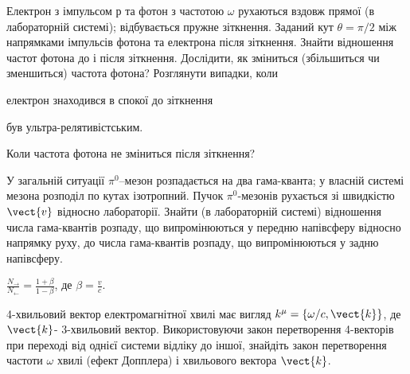\begin{problem}
Електрон з імпульсом $р$ та фотон з частотою $\omega$ рухаються вздовж прямої (в лабораторній системі); відбувається пружне зіткнення. Заданий кут $\theta = \pi/2$ між напрямками імпульсів фотона та електрона після зіткнення. Знайти відношення частот фотона до і після зіткнення. Дослідити, як зміниться (збільшиться чи зменшиться) частота фотона? Розглянути випадки, коли
\begin{enumerate*}[label=\alph*)]
	\item електрон знаходився в спокої до зіткнення
	\item був ультра-релятивістським.
\end{enumerate*}
Коли частота фотона не зміниться після зіткнення?
\end{problem}

\begin{problem}
У загальній ситуації $\pi^0$–мезон розпадається на два гама-кванта; у власній системі мезона розподіл по кутах ізотропний. Пучок $\pi^0$-мезонів рухається зі швидкістю $\vect{v}$ відносно лабораторії. Знайти (в лабораторній системі) відношення числа гама-квантів розпаду, що випромінюються у передню напівсферу відносно напрямку руху, до числа гама-квантів розпаду, що випромінюються у задню напівсферу.
\begin{solution}
	$\frac{N_\rightarrow}{N_\leftarrow} = \frac{1+ \beta}{1-\beta}$, де $\beta = \frac{v}{c}$.
\end{solution}
\end{problem}

\begin{problem}
    4-хвильовий вектор електромагнітної хвилі має вигляд $k^{\mu} = \{\omega/c,\vect{k}\}$, де $\vect{k}$- 3-хвильовий вектор. Використовуючи закон перетворення 4-векторів при переході від однієї системи відліку до іншої, знайдіть закон перетворення частоти $\omega$ хвилі (ефект Допплера) і хвильового вектора $\vect{k}$.
\end{problem}



